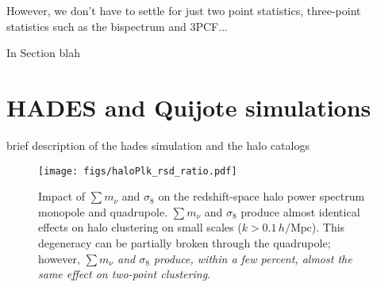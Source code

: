 \documentclass[12pt, letterpaper, preprint]{aastex62}
\newcommand{\smnu}{\sum m_\nu}
\newcommand{\sig}{\sigma_8}
\newcommand{\hmpc}{\,h/\mathrm{Mpc}}
\begin{document}
However, we don't have to settle for just two point statistics, three-point 
statistics such as the bispectrum and 3PCF... 

In Section blah 


\section{HADES and Quijote simulations} \label{sec:hades} 
brief description of the hades simulation and the halo catalogs

\begin{figure}
\begin{center}
\texttt{[image: figs/haloPlk\_rsd\_ratio.pdf]}
    \caption{Impact of $\smnu$ and $\sig$ on the redshift-space halo power 
    spectrum monopole and quadrupole. $\smnu$ and $\sig$ produce almost identical 
    effects on halo clustering on small scales ($k > 0.1\hmpc$). This degeneracy 
    can be partially broken through the quadrupole; however, {\em $\smnu$ and $\sig$ 
    produce, within a few percent, almost the same effect on two-point clustering}.
    }
\label{fig:plk}
\end{center}
\end{figure}
\end{document}
